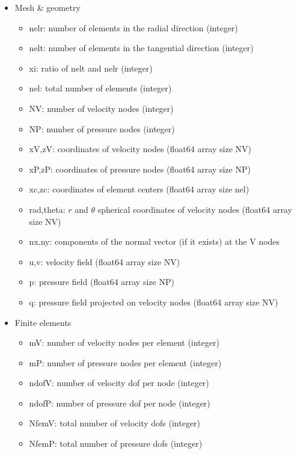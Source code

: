 
\begin{itemize}
\item Mesh \& geometry
\begin{itemize}
\item {\python nelr}: number of elements in the radial direction  (integer)
\item {\python nelt}: number of elements in the tangential direction (integer)
\item {\python xi}: ratio of {\python nelt} and {\python nelr} (integer)
\item {\python nel}: total number of elements (integer)
\item {\python NV}: number of velocity nodes (integer)
\item {\python NP}: number of pressure nodes (integer)
\item {\python xV,zV}: coordinates of velocity nodes (float64 array size {\python NV}) 
\item {\python xP,zP}: coordinates of pressure nodes (float64 array size {\python NP}) 
\item {\python xc,zc}: coordinates of element centers (float64 array size {\python nel}) 
\item {\python rad,theta}: $r$ and $\theta$ spherical coordinates of velocity nodes  (float64 array size {\python NV}) 
\item {\python nx,ny}: components of the normal vector (if it exists) at the V nodes
\item {\python u,v}: velocity field (float64 array size {\python NV})
\item {\python p}: pressure field (float64 array size {\python NP})
\item {\python q}: pressure field projected on velocity nodes (float64 array size {\python NV})
\end{itemize}
\item Finite elements
\begin{itemize}
\item {\python mV}: number of velocity nodes per element (integer)
\item {\python mP}: number of pressure nodes per element (integer)
\item {\python ndofV}: number of velocity dof per node (integer) 
\item {\python ndofP}: number of pressure dof per node (integer) 
\item {\python NfemV}: total number of velocity dofs (integer) 
\item {\python NfemP}: total number of pressure dofs  (integer) 

\end{itemize}
\end{itemize}
